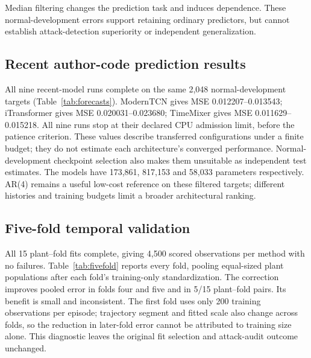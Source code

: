 Median filtering changes the prediction task and induces dependence. These normal-development errors support retaining ordinary predictors, but cannot establish attack-detection superiority or independent generalization.

\subsection{Recent author-code prediction results}
All nine recent-model runs complete on the same 2,048 normal-development targets (Table~\ref{tab:forecasts}). ModernTCN gives MSE 0.012207--0.013543; iTransformer gives MSE 0.020031--0.023680; TimeMixer gives MSE 0.011629--0.015218. All nine runs stop at their declared CPU admission limit, before the patience criterion. These values describe transferred configurations under a finite budget; they do not estimate each architecture's converged performance. Normal-development checkpoint selection also makes them unsuitable as independent test estimates. The models have 173,861, 817,153 and 58,033 parameters respectively. AR(4) remains a useful low-cost reference on these filtered targets; different histories and training budgets limit a broader architectural ranking.

\begin{table}[t]\centering
\caption{Recent author-code forecasts: all seeds, completed/selected epochs, standardized development MSE and per-seed fitting/scoring CPU. Stops: C, CPU admission; P, patience; E, epoch ceiling. No attack score is measured.}\label{tab:forecasts}
\setlength{\tabcolsep}{4pt}
\end{table}

\subsection{Five-fold temporal validation}
All 15 plant--fold fits complete, giving 4,500 scored observations per method with no failures. Table~\ref{tab:fivefold} reports every fold, pooling equal-sized plant populations after each fold's training-only standardization. The correction improves pooled error in folds four and five and in 5/15 plant--fold pairs. Its benefit is small and inconsistent. The first fold uses only 200 training observations per episode; trajectory segment and fitted scale also change across folds, so the reduction in later-fold error cannot be attributed to training size alone. This diagnostic leaves the original fit selection and attack-audit outcome unchanged.

